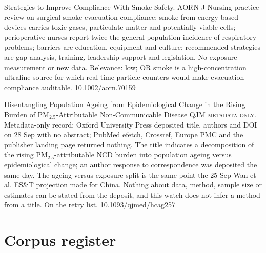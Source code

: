 \documentclass[10pt]{article}
\begin{document}
{Strategies to Improve Compliance With Smoke Safety.}
{AORN J}
{Nursing practice review on surgical-smoke evacuation compliance: smoke from energy-based devices carries toxic gases, particulate matter and potentially viable cells; perioperative nurses report twice the general-population incidence of respiratory problems; barriers are education, equipment and culture; recommended strategies are gap analysis, training, leadership support and legislation. No exposure measurement or new data. Relevance: low; OR smoke is a high-concentration ultrafine source for which real-time particle counters would make evacuation compliance auditable.}
{10.1002/aorn.70159}

\par{}\baselineskip{}\baselineskip
{}

{Disentangling Population Ageing from Epidemiological Change in the Rising Burden of PM$_{2.5}$-Attributable Non-Communicable Disease}
{QJM}
{\textsc{metadata only.} Metadata-only record: Oxford University Press deposited title, authors and DOI on 28 Sep with no abstract; PubMed efetch, Crossref, Europe PMC and the publisher landing page returned nothing. The title indicates a decomposition of the rising PM$_{2.5}$-attributable NCD burden into population ageing versus epidemiological change; an author response to correspondence was deposited the same day. The ageing-versus-exposure split is the same point the 25 Sep Wan et al. ES\&T projection made for China. Nothing about data, method, sample size or estimates can be stated from the deposit, and this watch does not infer a method from a title. On the retry list.}
{10.1093/qjmed/hcag257}

\clearpage
\section*{\sffamily\bfseries\color{Deep}Corpus register}
\vspace{-1.5mm}{\color{Amber}\rule{\linewidth}{1.1pt}}\vspace{2.5mm}



\vspace{2mm}
\end{document}
